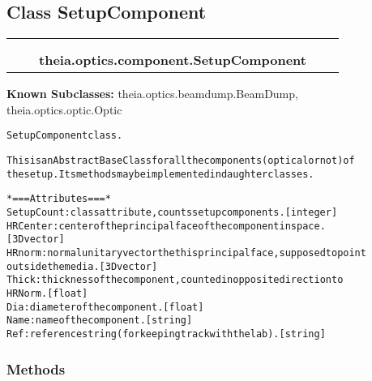 \subsection{Class SetupComponent}

    \label{theia:optics:component:SetupComponent}
\begin{tabular}{cccccc}
\multicolumn{2}{r}{\settowidth{\BCL}{object}\multirow{2}{\BCL}{object}}
&&
  \\\cline{3-3}
  &&\multicolumn{1}{c|}{}
&&
  \\
&&\multicolumn{2}{l}{\textbf{theia.optics.component.SetupComponent}}
\end{tabular}

\textbf{Known Subclasses:}
theia.optics.beamdump.BeamDump,
    theia.optics.optic.Optic

\begin{alltt}


SetupComponent class.

This is an Abstract Base Class for all the components (optical or not) of
the setup. Its methods may be implemented in daughter classes.

*=== Attributes ===*
SetupCount: class attribute, counts setup components. [integer]
HRCenter: center of the principal face of the component in space.
    [3D vector]
HRnorm: normal unitary vector the this principal face, supposed to point
    outside the media. [3D vector]
Thick: thickness of the component, counted in opposite direction to
    HRNorm. [float]
Dia: diameter of the component. [float]
Name: name of the component. [string]
Ref: reference string (for keeping track with the lab). [string]
\end{alltt}



  \subsubsection{Methods}

    \vspace{0.5ex}


